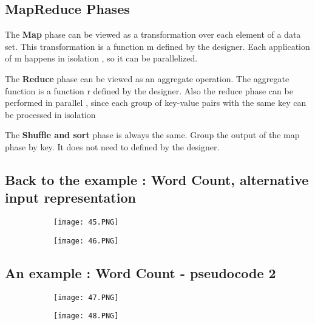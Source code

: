 \documentclass{article}
\begin{document}
\subsection{MapReduce Phases}

The \textbf{Map} phase can be viewed as a transformation over each element of a data set.
This transformation is a function m defined by the designer. Each application of m happens in isolation , so it can be parallelized.

The \textbf{Reduce} phase can be viewed as an aggregate operation. The aggregate function is a function r defined by the designer. Also the reduce phase can be performed in parallel , since each group of key-value pairs with the same key can be processed in isolation

The \textbf{Shuffle and sort} phase is always the same. Group the output of the map phase by key. It does not need to defined by the designer.
\vspace{50mm}

\subsection{Back to the example : Word Count, alternative input representation}

\begin{figure}[ht!]
  \centering
  \begin{subfigure}[b]{0.5\linewidth}
    \texttt{[image: 45.PNG]}
  \end{subfigure}
     \begin{subfigure}[b]{0.4\textwidth}
         \centering
         \texttt{[image: 46.PNG]}
     \end{subfigure}
\end{figure}


\vspace{40mm}


\subsection{An example : Word Count - pseudocode 2}
\begin{figure}[ht!]
  \centering
  \begin{subfigure}[b]{0.5\linewidth}
    \texttt{[image: 47.PNG]}
  \end{subfigure}
     \begin{subfigure}[b]{0.4\textwidth}
         \centering
         \texttt{[image: 48.PNG]}
     \end{subfigure}
\end{figure}
\vspace{50mm}
\end{document}
